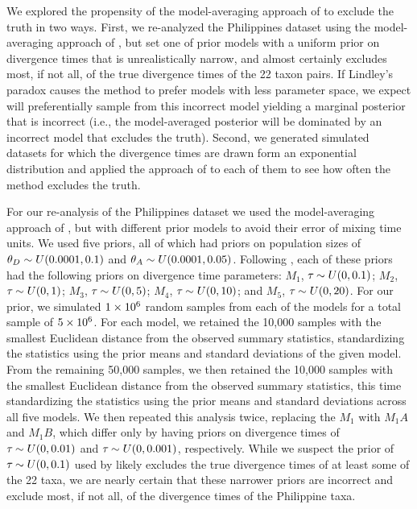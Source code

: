 \documentclass[letterpaper,12pt]{article}
\begin{document}
\begin{linenumbers}
We explored the propensity of the model-averaging approach of
\citet{Hickerson2013} to exclude the truth in two ways.
First, we re-analyzed the Philippines dataset using the model-averaging approach
of \citet{Hickerson2013}, but set one of prior models with a uniform prior on
divergence times that is unrealistically narrow, and almost certainly excludes
most, if not all, of the true divergence times of the 22 taxon pairs.
If Lindley's paradox causes the method to prefer models with less parameter
space, we expect \msb will preferentially sample from this incorrect model
yielding a marginal posterior that is incorrect (i.e., the model-averaged
posterior will be dominated by an incorrect model that excludes the truth).
Second, we generated simulated datasets for which the divergence times are
drawn form an exponential distribution and applied the approach of
\citet{Hickerson2013} to each of them to see how often the method excludes the
truth.

For our re-analysis of the Philippines dataset we used the model-averaging
approach of \citet{Hickerson2013}, but with different prior models to avoid
their error of mixing time units.
We used five priors, all of which had priors on population sizes of
$\meanDescendantTheta{} \sim U(0.0001, 0.1)$ and $\ancestralTheta{} \sim
U(0.0001, 0.05)$.
Following \citet{Hickerson2013}, each of these priors had the following
priors on divergence time parameters:
$M_1$, $\tau_{} \sim U(0, 0.1)$;
$M_2$, $\tau_{} \sim U(0, 1)$;
$M_3$, $\tau_{} \sim U(0, 5)$;
$M_4$, $\tau_{} \sim U(0, 10)$; and
$M_5$, $\tau_{} \sim U(0, 20)$.
For our prior, we simulated $1\times 10^{6}$ random samples from each of the models
for a total sample of $5\times 10^{6}$.
For each model, we retained the 10,000 samples with the smallest Euclidean
distance from the observed summary statistics, standardizing the statistics
using the prior means and standard deviations of the given model.
From the remaining 50,000 samples, we then retained the 10,000 samples with the
smallest Euclidean distance from the observed summary statistics, this time
standardizing the statistics using the prior means and standard deviations
across all five models.
We then repeated this analysis twice, replacing the $M_1$ with
$M_1A$ and $M_1B$, which differ only by having priors on divergence
times of $\tau_{} \sim U(0, 0.01)$ and $\tau_{} \sim U(0, 0.001)$,
respectively.
While we suspect the prior of $\tau_{} \sim U(0, 0.1)$ used by
\citet{Hickerson2013} likely excludes the true divergence times of at least
some of the 22 taxa, we are nearly certain that these narrower priors are
incorrect and exclude most, if not all, of the divergence times of the
Philippine taxa.


\end{linenumbers}
\end{document}
